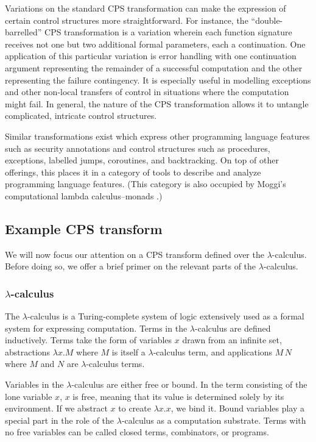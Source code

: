 \documentclass[ms,electronic,twosidetoc,letterpaper,chaptercenter,parttop]{byumsphd}
\begin{document}
Variations on the standard CPS transformation can make the expression of certain control
structures more straightforward. For instance, the ``double-barrelled'' CPS transformation
is a variation wherein each function signature receives not one but two additional formal
parameters, each a continuation. One application of this particular variation is error
handling with one continuation argument representing the remainder of a successful
computation and the other representing the failure contingency. It is especially useful in
modelling exceptions and other non-local transfers of control in situations where the
computation might fail. In general, the nature of the CPS transformation allows it to
untangle complicated, intricate control structures.

Similar transformations exist which express other programming language features such as
security annotations \cite{wallach2000safkasi} and control structures such as procedures,
exceptions, labelled jumps, coroutines, and backtracking. On top of other offerings, this
places it in a category of tools to describe and analyze programming language features.
(This category is also occupied by Moggi's computational lambda calculus--monads
\cite{moggi1989computational}.)

\subsection{Example CPS transform}

We will now focus our attention on a CPS transform defined over the $\lambda$-calculus.
Before doing so, we offer a brief primer on the relevant parts of the $\lambda$-calculus.

\subsubsection{$\lambda$-calculus}

The $\lambda$-calculus is a Turing-complete system of logic extensively used as a formal
system for expressing computation. Terms in the $\lambda$-calculus are defined
inductively. Terms take the form of variables $x$ drawn from an infinite set, abstractions
$\lambda x.M$ where $M$ is itself a $\lambda$-calculus term, and applications $M\,N$ where
$M$ and $N$ are $\lambda$-calculus terms.

Variables in the $\lambda$-calculus are either free or bound. In the term consisting of
the lone variable $x$, $x$ is free, meaning that its value is determined solely by its
environment. If we abstract $x$ to create $\lambda x.x$, we bind it.
Bound variables play a special part in the role of the $\lambda$-calculus as a computation
substrate. Terms with no free variables can be called closed terms, combinators, or programs.
\end{document}
